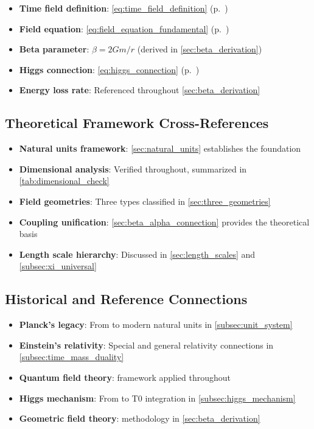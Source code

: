 \documentclass[12pt,a4paper]{article}
\begin{document}
	\begin{itemize}
		\item \textbf{Time field definition}: \cref{eq:time_field_definition} (p.~\pageref{eq:time_field_definition})
		\item \textbf{Field equation}: \cref{eq:field_equation_fundamental} (p.~\pageref{eq:field_equation_fundamental})
		\item \textbf{Beta parameter}: $\beta = 2Gm/r$ (derived in \cref{sec:beta_derivation})
		\item \textbf{Higgs connection}: \cref{eq:higgs_connection} (p.~\pageref{eq:higgs_connection})
		\item \textbf{Energy loss rate}: Referenced throughout \cref{sec:beta_derivation}
	\end{itemize}
	
	\subsection{Theoretical Framework Cross-References}
	\label{app:theoretical_framework}
	
	\begin{itemize}
		\item \textbf{Natural units framework}: \cref{sec:natural_units} establishes the foundation
		\item \textbf{Dimensional analysis}: Verified throughout, summarized in \cref{tab:dimensional_check}
		\item \textbf{Field geometries}: Three types classified in \cref{sec:three_geometries}
		\item \textbf{Coupling unification}: \cref{sec:beta_alpha_connection} provides the theoretical basis
		\item \textbf{Length scale hierarchy}: Discussed in \cref{sec:length_scales} and \cref{subsec:xi_universal}
	\end{itemize}
	
	\subsection{Historical and Reference Connections}
	\label{app:historical_connections}
	
	\begin{itemize}
		\item \textbf{Planck's legacy}: From \citet{planck1900,planck1906} to modern natural units in \cref{subsec:unit_system}
		\item \textbf{Einstein's relativity}: Special \citep{einstein1905} and general \citep{einstein1915} relativity connections in \cref{subsec:time_mass_duality}
		\item \textbf{Quantum field theory}: \citet{weinberg1995,peskin1995} framework applied throughout
		\item \textbf{Higgs mechanism}: From \citet{higgs1964,englert1964} to T0 integration in \cref{subsec:higgs_mechanism}
		\item \textbf{Geometric field theory}: \citet{misner1973} methodology in \cref{sec:beta_derivation}
	\end{itemize}
	
\end{document}
